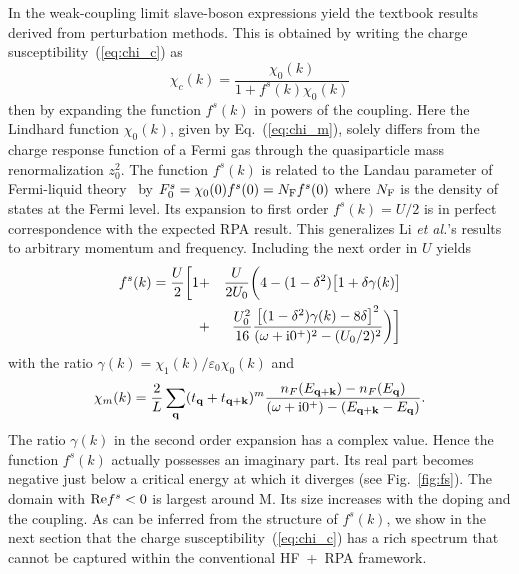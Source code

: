 \documentclass[showpacs,amsmath,twocolumn,floatfix]{revtex4-1}
\begin{document}
In the weak-coupling limit slave-boson expressions yield the textbook 
results derived from perturbation methods. This is obtained by 
writing the charge susceptibility~(\ref{eq:chi_c}) as
\begin{equation}
 \chi_c(k) = \frac{\chi_0(k)}{1 + f^s(k) \chi_0(k)}
  \label{eq:chi_c_weak}
\end{equation}
then by expanding the function $f^s(k)$ in powers of the coupling. Here 
the Lindhard function $\chi_0(k)$, given by Eq.~(\ref{eq:chi_m}), 
solely differs from the charge response function of a Fermi gas 
through the quasiparticle mass renormalization $z_0^2$. The function $f^s(k)$ 
is related to the Landau parameter of Fermi-liquid theory~\cite{lhoutellier15} 
by $F_0^s = \chi_0(0) f^s(0) = N_{\rm F} f^s(0)$ where $N_{\rm F}$ is the 
density of states at the Fermi level. Its expansion to first order 
$f^s(k) = U/2$ is in perfect correspondence with the expected RPA result. This 
generalizes Li {\it et al.}'s results~\cite{li91,li94} to arbitrary momentum 
and frequency. Including the next order in $U$ yields
\begin{eqnarray}
 f^s(k) = \frac{U}{2} \bigg[ 1 & + & \frac{U}{2 U_0} \bigg( 4 - (1-\delta^2)
 \big[1+\delta \gamma(k)\big]  \nonumber \\
 & + & \frac{U_0^2}{16} \frac{\big[(1-\delta^2) \gamma(k) - 8 \delta\big]^2}
 {(\omega + {\rm i} 0^+)^2 - (U_0/2)^2} \bigg) \bigg]  
\label{eq:f0s}
\end{eqnarray}
with the ratio $\gamma(k)=\chi_1(k)/\varepsilon_0\chi_0(k)$ and
\begin{equation}
  \chi_m(k) = \frac{2}{L} \sum_{\bf q} (t_{\bf q} + t_{{\bf q} + {\bf k}} )^m 
 \frac{n_F(E_{{\bf q} + {\bf k}}) - n_F(E_{{\bf q} })}
 {(\omega + {\rm i} 0^+) - (E_{{\bf q} + {\bf k}} - E_{\bf q})}.
 \label{eq:chi_m}
\end{equation}
The ratio $\gamma(k)$ in the second order expansion has a complex value. 
Hence the function $f^s(k)$ actually possesses an imaginary part. 
Its real part becomes negative just below a critical energy at which it 
diverges (see Fig.~\ref{fig:fs}). The domain with ${\rm Re} f^s <0$ is largest 
around M. Its size increases with the doping and the coupling. As can be inferred 
from the structure of $f^s(k)$, we show in the next section that the charge 
susceptibility~(\ref{eq:chi_c}) has a rich spectrum that cannot be captured 
within the conventional HF~+~RPA framework.  
\end{document}
